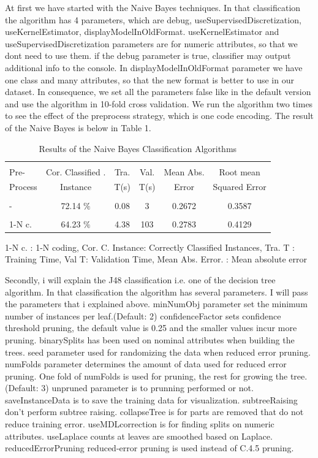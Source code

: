 \documentclass[a4paper]{article}
\begin{document}
At first we have started with the Naive Bayes techniques. In that classification the algorithm has 4 parameters, which are debug, useSupervisedDiscretization, useKernelEstimator, displayModelInOldFormat. useKernelEstimator and useSupervisedDiscretization parameters are for numeric attributes, so that we dont need to use them. if the debug parameter is true, classifier may output additional info to the console. In displayModelInOldFormat parameter we have one class and many attributes, so that the new format is better to use in our dataset. In consequence, we set all the parameters false like in the default version and use the algorithm in 10-fold cross validation. We run the algorithm two times to see the effect of the preprocess strategy, which is one code encoding. The result of the Naive Bayes is below in Table 1.

\begin{table}
\begin{tabular}{|l| c | c | c |c |c |}

\hline & & & & & \\
Pre- & Cor. Classified . & Tra. & Val. & Mean Abs.  & Root mean \\
Process & Instance & T(s) &  T(s) & Error & Squared Error \\
\hline & & & & & \\
- &72.14  $\%$ & 0.08 & 3 &  0.2672 & 0.3587 \\ 
\hline & & & & & \\
1-N c. &64.23  $\%$ & 4.38 & 103 & 0.2783 & 0.4129 \\ 
\hline
\end{tabular}
\caption{Results of the Naive Bayes Classification Algorithms}
	1-N c. : 1-N coding,
	Cor. C. Instance:  Correctly Classified Instances,
	Tra. T : Training Time,
	Val T: Validation Time,
	Mean Abs. Error. : Mean absolute error 
\end{table}

Secondly, i will explain the J48 classification i.e. one of the decision tree algorithm. In that classification the algorithm has several parameters. I will pass the parameters that i explained above. minNumObj parameter set the minimum number of instances per leaf.(Default: 2) confidenceFactor sets confidence threshold pruning, the default value is 0.25 and the smaller values incur more pruning. binarySplits has been used on nominal attributes when building the trees. seed parameter used for randomizing the data when reduced error pruning. numFolds parameter determines the amount of data used for reduced error pruning.  One fold of numFolds is used for pruning, the rest for growing the tree. (Default: 3) unpruned parameter is to prunning performed or not. saveInstanceData is to save the training data for visualization. subtreeRaising don't perform subtree raising. collapseTree is for parts are removed that do not reduce training error. useMDLcorrection is for finding splits on numeric attributes. useLaplace counts at leaves are smoothed based on Laplace. reducedErrorPruning reduced-error pruning is used instead of C.4.5 pruning. 
\end{document}
